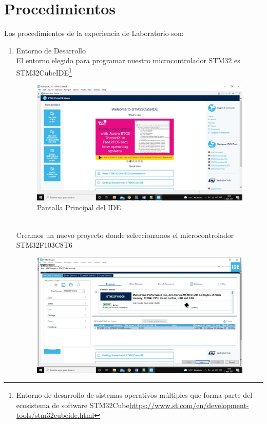 \documentclass[12pt,oneside,spanish]{article}
\begin{document}
\section{Procedimientos}
Los procedimientos de la experiencia de Laboratorio son:
\begin{enumerate}
\item Entorno de Desarrollo \\
El entorno elegido para programar nuestro microcontrolador STM32 es STM32CubeIDE\footnote{Entorno de desarrollo de sistemas operativos múltiples que forma parte del ecosistema de software STM32Cube\url{https://www.st.com/en/development-tools/stm32cubeide.html}} 
\begin{figure}[h!]
    \centering
    \includegraphics[scale=0.3]{STM32CubeIDE/Home.jpeg}
    \caption{Pantalla Principal del IDE}
    \label{fig:my_label}
\end{figure}
\\
Creamos un nuevo proyecto donde seleccionamos el microcontrolador STM32F103C8T6
\newpage
\begin{figure}[h!]
    \centering
    \includegraphics[scale=0.3]{STM32CubeIDE/SelecMicro.jpeg}

\end{figure}
\end{enumerate}
\end{document}
